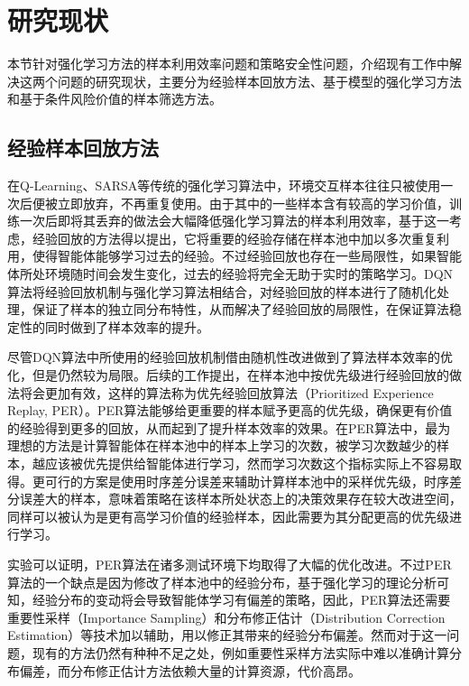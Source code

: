 \section{研究现状}

本节针对强化学习方法的样本利用效率问题和策略安全性问题，介绍现有工作中解决这两个问题的研究现状，主要分为经验样本回放方法、基于模型的强化学习方法和基于条件风险价值的样本筛选方法。

\subsection{经验样本回放方法}

在Q-Learning、SARSA\cite{watkins1992q,sutton2018reinforcement}等传统的强化学习算法中，环境交互样本往往只被使用一次后便被立即放弃，不再重复使用。由于其中的一些样本含有较高的学习价值，训练一次后即将其丢弃的做法会大幅降低强化学习算法的样本利用效率，基于这一考虑，经验回放的方法得以提出\cite{lin1992self}，它将重要的经验存储在样本池中加以多次重复利用，使得智能体能够学习过去的经验\cite{adam2011experience}。不过经验回放也存在一些局限性，如果智能体所处环境随时间会发生变化，过去的经验将完全无助于实时的策略学习。DQN算法\cite{mnih2013playing}将经验回放机制与强化学习算法相结合，对经验回放的样本进行了随机化处理，保证了样本的独立同分布特性，从而解决了经验回放的局限性，在保证算法稳定性的同时做到了样本效率的提升。

尽管DQN算法中所使用的经验回放机制借由随机性改进做到了算法样本效率的优化，但是仍然较为局限。后续的工作提出，在样本池中按优先级进行经验回放的做法将会更加有效，这样的算法称为优先经验回放算法（Prioritized Experience Replay, PER）\cite{schaul2015prioritized}。PER算法能够给更重要的样本赋予更高的优先级，确保更有价值的经验得到更多的回放，从而起到了提升样本效率的效果。在PER算法中，最为理想的方法是计算智能体在样本池中的样本上学习的次数，被学习次数越少的样本，越应该被优先提供给智能体进行学习，然而学习次数这个指标实际上不容易取得。更可行的方案是使用时序差分误差来辅助计算样本池中的采样优先级，时序差分误差大的样本，意味着策略在该样本所处状态上的决策效果存在较大改进空间，同样可以被认为是更有高学习价值的经验样本\cite{tesauro1995temporal}，因此需要为其分配更高的优先级进行学习。

实验可以证明，PER算法在诸多测试环境下均取得了大幅的优化改进。不过PER算法的一个缺点是因为修改了样本池中的经验分布，基于强化学习的理论分析可知，经验分布的变动将会导致智能体学习有偏差的策略，因此，PER算法还需要重要性采样（Importance Sampling）\cite{tokdar2010importance}和分布修正估计（Distribution Correction Estimation）\cite{lee2021optidice}等技术加以辅助，用以修正其带来的经验分布偏差。然而对于这一问题，现有的方法仍然有种种不足之处，例如重要性采样方法实际中难以准确计算分布偏差，而分布修正估计方法依赖大量的计算资源，代价高昂。

